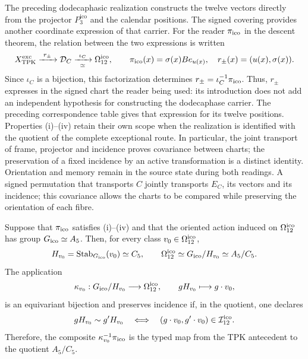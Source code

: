 The preceding dodecaphasic realization constructs the twelve vectors
directly from the projector \(P_3^{\mathrm{ico}}\) and the calendar positions.
The signed covering provides another coordinate expression of that
carrier. For the reader \(\pi_{\rm ico}\) in the descent theorem,
the relation between the two expressions is written
\begin{equation}
 X_{\rm TPK}^{\rm exc}\xrightarrow{\ r_\pm\ }
 \mathcal D_C\xrightarrow[\simeq]{\ \iota_C\ }
 \Omega_{12}^{\rm ico},\qquad
 \pi_{\rm ico}(x)=\sigma(x)Be_{u(x)},\quad
 r_\pm(x)=(u(x),\sigma(x)).
 \label{ii:ii:ico:factorizacion-lector}
\end{equation}
Since \(\iota_C\) is a bijection, this factorization determines
\(r_\pm=\iota_C^{-1}\pi_{\rm ico}\). Thus, \(r_\pm\) expresses
in the signed chart the reader being used: its introduction
does not add an independent hypothesis for constructing the dodecaphase
carrier. The preceding correspondence table gives that expression
for its twelve positions. Properties (i)--(iv) retain their
own scope when the realization is identified with the quotient
of the complete exceptional route. In particular, the joint transport
of frame, projector and incidence proves covariance between charts;
the preservation of a fixed incidence by an active transformation
is a distinct identity. Orientation and memory remain
in the source state during both readings.
A signed permutation that transports \(C\) jointly transports
\(E_C\), its vectors and its incidence; this covariance allows the charts
to be compared while preserving the orientation of each fibre.



\begin{theorem}
\label{ii:ii:pent:thm:gravity-exceptional-descent}
Suppose that \(\pi_{\rm ico}\) satisfies (i)--(iv) and that the oriented action
induced on \(\Omega_{12}^{\rm ico}\) has group
\(G_{\rm ico}\simeq A_5\). Then, for every class
\(v_0\in\Omega_{12}^{\rm ico}\),
\begin{equation}
\label{ii:ii:pent:eq:gravity-icosahedral-quotient}
H_{v_0}=\operatorname{Stab}_{G_{\rm ico}}(v_0)\simeq C_5,
\qquad
\Omega_{12}^{\rm ico}\simeq G_{\rm ico}/H_{v_0}\simeq A_5/C_5.
\end{equation}
The application
\begin{equation}
\label{ii:ii:pent:eq:gravity-coset-map}
\kappa_{v_0}:G_{\rm ico}/H_{v_0}\longrightarrow\Omega_{12}^{\rm ico},
\qquad gH_{v_0}\longmapsto g\cdot v_0,
\end{equation}
is an equivariant bijection and preserves incidence if, in the quotient,
one declares
\begin{equation}
\label{ii:ii:pent:eq:gravity-coset-incidence}
gH_{v_0}\sim g'H_{v_0}
\quad\Longleftrightarrow\quad
(g\cdot v_0,g'\cdot v_0)\in\mathcal I_{12}^{\rm ico}.
\end{equation}
Therefore, the composite \(\kappa_{v_0}^{-1}\pi_{\rm ico}\) is the typed map from the TPK
antecedent to the quotient \(A_5/C_5\).
\end{theorem}

